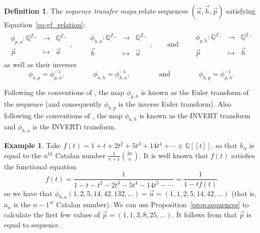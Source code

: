 \documentclass[11pt]{amsart}
\theoremstyle{definition}
\newtheorem{definition}[theorem]{Definition}
\newtheorem{example}[theorem]{Example}
\numberwithin{equation}{section}
\def\ZZ{{\mathbb Z}}
\def\QQ{{\mathbb Q}}
\begin{document}
\begin{definition}
\label{defn:sequencetransfer}
The \emph{sequence transfer maps} relate sequences $(\vec{a}, \vec{h}, \vec{p})$ satisfying Equation~\eqref{eq:gf_relation}:
\begin{align*}
\begin{array}{rcl}
\phi_{p, a} : \QQ^{\ZZ_+} & \to & \QQ^{\ZZ_+} \\
\vec{p} & \mapsto & \vec{a}
\end{array},
\qquad
\begin{array}{rcl}
\phi_{h, a} : \QQ^{\ZZ_+} & \to & \QQ^{\ZZ_+} \\
\vec{h} & \mapsto & \vec{a}
\end{array},
\qquad\text{and}\qquad 
\begin{array}{rcl}
\phi_{p, h} : \QQ^{\ZZ_+} & \to & \QQ^{\ZZ_+} \\
\vec{p} & \mapsto & \vec{h}
\end{array}
\end{align*}
as well as their inverses
\[
\phi_{a, p} = \phi_{p, a}^{-1},
\qquad\qquad
\phi_{a, h} = \phi_{h, a}^{-1},
\qquad\qquad\text{and}\qquad\qquad
\phi_{h, p} = \phi_{p, h}^{-1}.
\]
\end{definition}

Following the conventions of \cite{OEIS}, the map $\phi_{p,h}$ is known
as the Euler transform of the sequence
(and consequently $\phi_{h,p}$ is the inverse Euler transform).
Also following the conventions
of \cite{OEIS},
the map $\phi_{a,h}$ is known as the INVERT transform
and $\phi_{h,a}$ is the INVERTi transform.

\begin{example}
\label{ex:catalan}
Take $f(t) = 1 + t + 2 t^{2} + 5t^3 + 14t^4 + \cdots \in \QQ[[t]]$,
so that $h_n$ is equal to the $n^{th}$ Catalan number
$\frac{1}{n+1}\binom{2n}{n}$.  It is well known that $f(t)$ satisfies the functional equation
\[
f(t) = \frac{1}{1 - t - t^2 - 2t^3 - 5t^4 - 14t^5 - \cdots} = \frac{1}{1-t f(t)}
\]
so we have that $\phi_{h,a}(1,2,5,14,42,132,\ldots) = \vec{a} = (1,1,2,5,14,42, \ldots)$
(that is, $a_n$ is the $n-1^{st}$ Catalan number).
We can use Proposition~\ref{prop:sequences} to calculate the first few values of $\vec{p} = (1,1,3,8,25, \ldots)$.
It follows from \cite[\S 5.1.3]{NT05} that $\vec{p}$ is equal to sequence \cite[A022553]{OEIS}.
\end{example}
\end{document}
